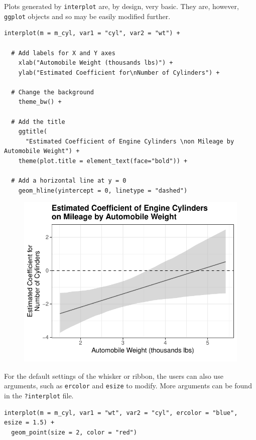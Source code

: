 \documentclass[
  article]{jss}
\begin{document}
Plots generated by \texttt{interplot} are, by design, very basic. They
are, however, \texttt{ggplot} objects and so may be easily modified
further.

\begin{verbatim}
interplot(m = m_cyl, var1 = "cyl", var2 = "wt") + 

  # Add labels for X and Y axes
    xlab("Automobile Weight (thousands lbs)") +
    ylab("Estimated Coefficient for\nNumber of Cylinders") +
    
  # Change the background
    theme_bw() +
    
  # Add the title
    ggtitle(
      "Estimated Coefficient of Engine Cylinders \non Mileage by Automobile Weight") +
    theme(plot.title = element_text(face="bold")) +
    
  # Add a horizontal line at y = 0
    geom_hline(yintercept = 0, linetype = "dashed")
\end{verbatim}

\begin{figure}[H]

{\centering \includegraphics{jss_manuscript_files/figure-pdf/unnamed-chunk-7-1.pdf}

}

\end{figure}

For the default settings of the whisker or ribbon, the users can also
use arguments, such as \texttt{ercolor} and \texttt{esize} to modify.
More arguments can be found in the \texttt{?interplot} file.

\begin{verbatim}
interplot(m = m_cyl, var1 = "wt", var2 = "cyl", ercolor = "blue", esize = 1.5) +
  geom_point(size = 2, color = "red")
\end{verbatim}
\end{document}
